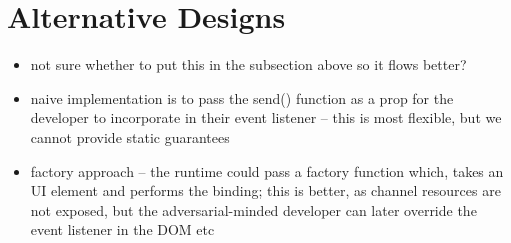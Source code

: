 \section{Alternative Designs}
\begin{itemize}
\item not sure whether to put this in the subsection above so it flows better?
\item naive implementation is to pass the send() function as a prop for the developer to incorporate in their event listener -- this is most flexible, but we cannot provide static guarantees
\item factory approach -- the runtime could pass a factory function which, takes an UI element and performs the binding; this is better, as channel resources are not exposed, but the adversarial-minded developer can later override the event listener in the DOM etc
\end{itemize}